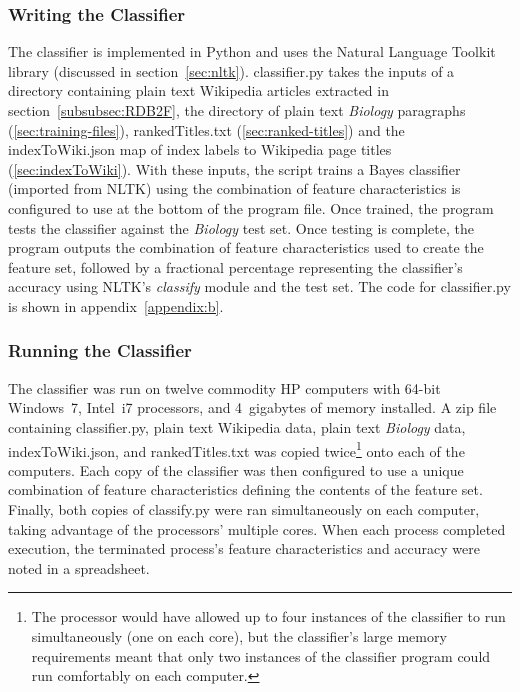 \subsubsection{Writing the Classifier}

The classifier is implemented in Python and uses the Natural Language Toolkit library (discussed in section~\ref{sec:nltk}).
classifier.py takes the inputs of a directory containing plain text Wikipedia articles extracted in section~\ref{subsubsec:RDB2F}, the directory of plain text {\it Biology} paragraphs (\ref{sec:training-files}), rankedTitles.txt (\ref{sec:ranked-titles}) and the indexToWiki.json map of index labels to Wikipedia page titles (\ref{sec:indexToWiki}).
With these inputs, the script trains a \naive Bayes classifier (imported from NLTK) using the combination of feature characteristics is configured to use at the bottom of the program file.
Once trained, the program tests the classifier against the {\it Biology} test set.
Once testing is complete, the program outputs the combination of feature characteristics used to create the feature set, followed by a fractional percentage representing the classifier's accuracy using NLTK's {\it classify} module and the test set.
The code for classifier.py is shown in appendix~\ref{appendix:b}.

\subsubsection{Running the Classifier}

The classifier was run on twelve commodity HP computers with 64-bit Windows~7, Intel~i7 processors, and 4~gigabytes of memory installed.
A zip file containing classifier.py, plain text Wikipedia data, plain text {\it Biology} data, indexToWiki.json, and rankedTitles.txt was copied twice\footnote{The processor would have allowed up to four instances of the classifier to run simultaneously (one on each core), but the classifier's large memory requirements meant that only two instances of the classifier program could run comfortably on each computer.} onto each of the computers.
Each copy of the classifier was then configured to use a unique combination of feature characteristics defining the contents of the feature set.
Finally, both copies of classify.py were ran simultaneously on each computer, taking advantage of the processors' multiple cores.
When each process completed execution, the terminated process's feature characteristics and accuracy were noted in a spreadsheet.

